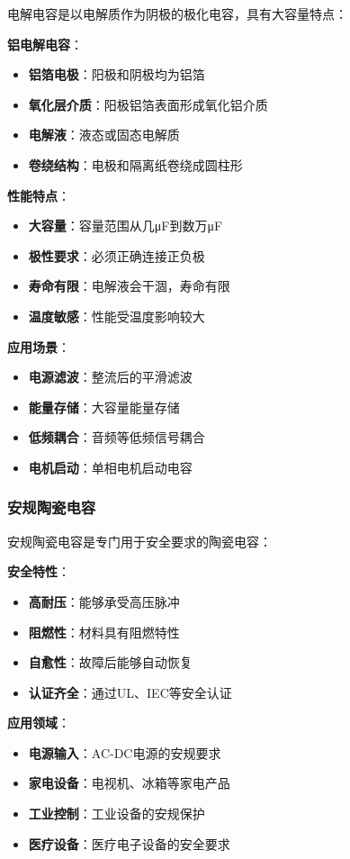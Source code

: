 \documentclass[12pt,UTF8]{ctexbook}
\begin{document}
电解电容是以电解质作为阴极的极化电容，具有大容量特点：

\textbf{铝电解电容}：
\begin{itemize}[leftmargin=3.5em]
	\item \textbf{铝箔电极}：阳极和阴极均为铝箔
	\item \textbf{氧化层介质}：阳极铝箔表面形成氧化铝介质
	\item \textbf{电解液}：液态或固态电解质
	\item \textbf{卷绕结构}：电极和隔离纸卷绕成圆柱形
\end{itemize}

\textbf{性能特点}：
\begin{itemize}[leftmargin=3.5em]
	\item \textbf{大容量}：容量范围从几μF到数万μF
	\item \textbf{极性要求}：必须正确连接正负极
	\item \textbf{寿命有限}：电解液会干涸，寿命有限
	\item \textbf{温度敏感}：性能受温度影响较大
\end{itemize}

\textbf{应用场景}：
\begin{itemize}[leftmargin=3.5em]
	\item \textbf{电源滤波}：整流后的平滑滤波
	\item \textbf{能量存储}：大容量能量存储
	\item \textbf{低频耦合}：音频等低频信号耦合
	\item \textbf{电机启动}：单相电机启动电容
\end{itemize}

\subsubsection{安规陶瓷电容}

安规陶瓷电容是专门用于安全要求的陶瓷电容：

\textbf{安全特性}：
\begin{itemize}[leftmargin=3.5em]
	\item \textbf{高耐压}：能够承受高压脉冲
	\item \textbf{阻燃性}：材料具有阻燃特性
	\item \textbf{自愈性}：故障后能够自动恢复
	\item \textbf{认证齐全}：通过UL、IEC等安全认证
\end{itemize}

\textbf{应用领域}：
\begin{itemize}[leftmargin=3.5em]
	\item \textbf{电源输入}：AC-DC电源的安规要求
	\item \textbf{家电设备}：电视机、冰箱等家电产品
	\item \textbf{工业控制}：工业设备的安规保护
	\item \textbf{医疗设备}：医疗电子设备的安全要求
\end{itemize}
\end{document}
